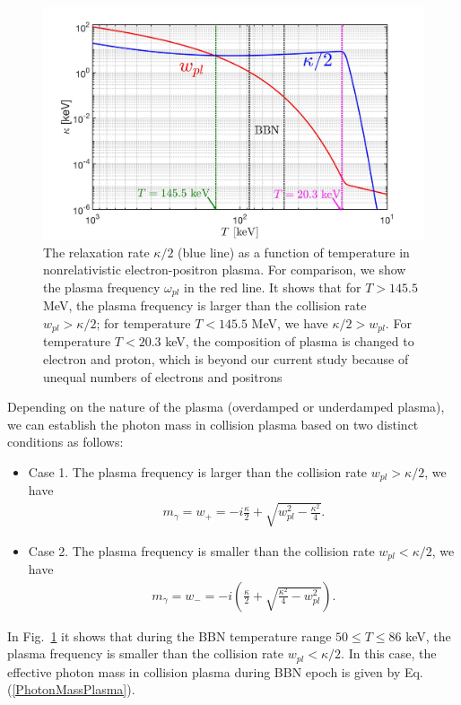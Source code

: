 \begin{figure}  
\centerline{\includegraphics[width=\linewidth]{./plots/KappaElectronPhotonMass_Talk}}
\caption{The relaxation rate $\kappa/2$ (blue line) as a function of temperature in nonrelativistic electron-positron plasma. For comparison, we show the plasma frequency $\omega_{pl}$ in the red line. It shows that for $T>145.5$ MeV, the plasma frequency is larger than the collision rate $w_{pl}>\kappa/2$; for temperature $T<145.5$ MeV, we have $\kappa/2>w_{pl}$. For temperature $T<20.3$ keV, the composition of plasma is changed to electron and proton, which is beyond our current study because of unequal numbers of electrons and positrons}
\label{RelaxationRate002_fig} 
\end{figure}
Depending on the nature of the plasma (overdamped or underdamped plasma), we can establish the photon mass in collision plasma based on two distinct conditions as follows:
\begin{itemize}
\item Case 1. The plasma frequency is larger than the collision rate $w_{pl}>\kappa/2$, we have
\begin{align}
m_\gamma=w_+=-i\frac{\kappa}{2}+\sqrt{w^2_{pl}-\frac{\kappa^2}{4}}.
\end{align}
\item Case 2. The plasma frequency is smaller than the collision rate $w_{pl}<\kappa/2$, we have
\begin{align}\label{PhotonMassPlasma}
m_\gamma=w_-=-i\left(\frac{\kappa}{2}+\sqrt{\frac{\kappa^2}{4}-w^2_{pl}}\right).
\end{align}
\end{itemize}
In Fig.~\ref{RelaxationRate002_fig} it shows that during the BBN temperature range $50\leqslant T\leqslant 86$ keV, the plasma frequency is smaller than the collision rate $w_{pl}<\kappa/2$.  In this case, the effective photon mass in collision plasma during BBN epoch is given by Eq.(\ref{PhotonMassPlasma}).


